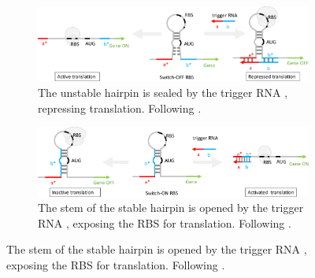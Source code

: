 \documentclass[12pt,notitlepage]{article}
\let\cite\citep
\begin{document}
\begin{figure}
    \centering
    
    \begin{subfigure}{\linewidth}
        \centering
        \includegraphics[width=\linewidth]{xor_ribocomputing/switch_off}
        \caption{%
            The unstable hairpin is sealed by 
            the trigger RNA ,
            repressing translation.
            Following 
            \cite[\href{https://www.nature.com/articles/s41589-019-0388-1/figures/1}{Fig.~1c}]{Kim2019}.
        }
        \label{f:switch_off_RBS}
    \end{subfigure}
    
    \vspace{1.5\baselineskip}
    
    \begin{subfigure}{\linewidth}
        \centering
        \includegraphics[width=\linewidth]{xor_ribocomputing/switch_on}
        \caption{%
            The stem of the stable hairpin 
            is opened by the trigger RNA , 
            exposing the RBS for translation. 
            Following 
            \cite[\href{https://www.sciencedirect.com/science/article/pii/S0092867414012896}{Fig.~1b}]{Green2014}.
        }
        \label{f:switch_on_RBS}
    \end{subfigure}
    
    \vspace{1.5\baselineskip}
    

\end{figure}
\end{document}
